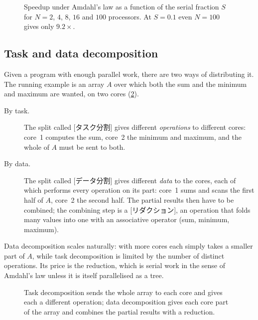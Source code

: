 \documentclass[../main.tex]{subfiles}
\begin{document}
\begin{figure}[htbp]
  \centering
  
  \caption{Speedup under Amdahl's law as a function of the serial
    fraction $S$ for $N = 2$, $4$, $8$, $16$ and $100$ processors.  At
    $S = 0.1$ even $N = 100$ gives only $9.2\times$.}
  \label{fig:l01-amdahl}
\end{figure}

\subsection{Task and data decomposition}

Given a program with enough parallel work, there are two ways of
distributing it.  The running example is an array $A$ over which both
the sum and the minimum and maximum are wanted, on two cores
(\cref{fig:l01-decomposition}).
\begin{description}
  \item[By task.]  The split called
    [タスク分割] gives different
    \emph{operations} to different cores: core~1 computes the sum, core~2
    the minimum and maximum, and the whole of $A$ must be sent to both.
  \item[By data.]  The split called
    [データ分割] gives different \emph{data}
    to the cores, each of which performs every operation on
    its part: core~1 sums and scans the first half of $A$, core~2 the
    second half.  The partial results then have to be combined; the
    combining step is a [リダクション], an operation
    that folds many values into one with an associative operator (sum,
    minimum, maximum).
\end{description}
Data decomposition scales naturally: with more cores each simply takes
a smaller part of $A$, while task decomposition is limited by the number
of distinct operations.  Its price is the reduction, which is serial
work in the sense of Amdahl's law unless it is itself parallelised as a
tree.

\begin{figure}[htbp]
  \centering
  
  \caption{Task decomposition sends the whole array to each core and
    gives each a different operation; data decomposition gives each core
    part of the array and combines the partial results with a reduction.}
  \label{fig:l01-decomposition}
\end{figure}
\end{document}
